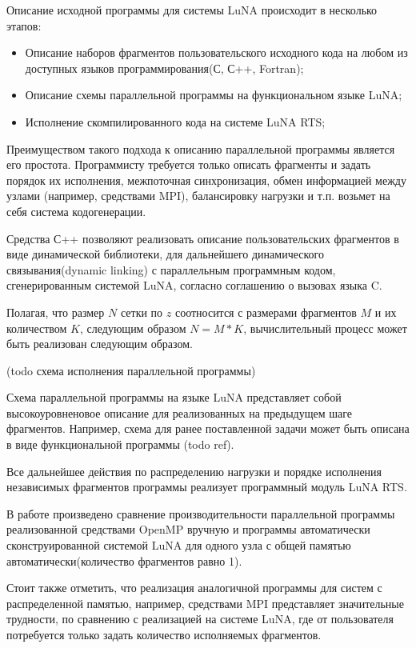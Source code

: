 Описание исходной программы для системы LuNA происходит в несколько этапов:

\begin{itemize}
    \item Описание наборов фрагментов пользовательского исходного кода
на любом из доступных языков программирования(С, С++, Fortran);
    \item Описание схемы параллельной программы на функциональном языке LuNA;
    \item Исполнение скомпилированного кода на системе LuNA RTS;
\end{itemize}

Преимуществом такого подхода к описанию параллельной программы является его простота. Программисту
требуется только описать фрагменты и задать порядок их исполнения, межпоточная синхронизация, обмен информацией между узлами
(например, средствами MPI), балансировку нагрузки и т.п. возьмет на себя система кодогенерации.

Средства С++ позволяют реализовать описание пользовательских фрагментов в виде динамической библиотеки,
для дальнейшего динамического связывания(dynamic linking) с параллельным программным кодом, сгенерированным системой LuNA,
согласно соглашению о вызовах языка C.

Полагая, что размер $N$ сетки по $z$ соотносится с размерами фрагментов $M$ и их количеством $K$,
следующим образом $N = M * K$, вычислительный процесс может быть реализован следующим образом.

(todo схема исполнения параллельной программы)

Схема параллельной программы на языке LuNA представляет собой высокоуровненовое описание для реализованных на предыдущем шаге фрагментов.
Например, схема для ранее поставленной задачи может быть описана в виде функциональной программы (todo ref).

Все дальнейшее действия по распределению нагрузки и порядке исполнения независимых фрагментов программы реализует
программный модуль LuNA RTS.

В работе произведено сравнение производительности параллельной программы реализованной средствами OpenMP вручную
и программы автоматически сконструированной системой LuNA для одного узла с общей памятью автоматически(количество фрагментов равно 1).

Стоит также отметить, что реализация аналогичной программы для систем с распределенной памятью, например, средствами MPI
представляет значительные трудности, по сравнению с реализацией на системе LuNA, где от пользователя потребуется только
задать количество исполняемых фрагментов.

